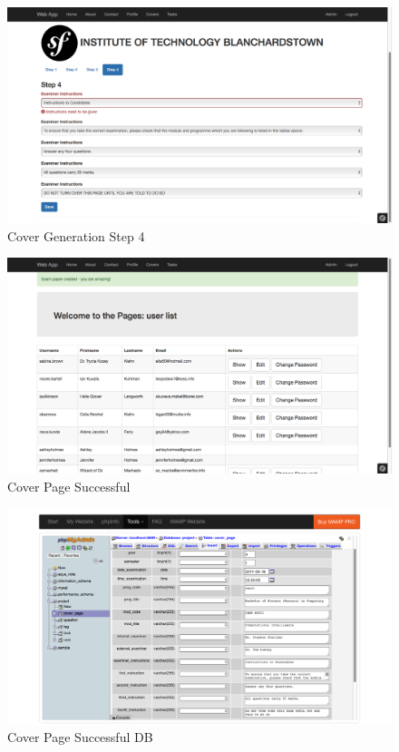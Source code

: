 \begin{figure}[htbp]
   \centering
   \includegraphics[width=400pt]{figures/step_4.png} %
   \caption{Cover Generation Step 4}
   \label{fig:Cover Generation Step 4}
\end{figure}

\begin{figure}[htbp]
   \centering
   \includegraphics[width=400pt]{figures/exam_success.png} %
   \caption{Cover Page Successful}
   \label{fig:Cover Page Successful}
\end{figure}

\begin{figure}[htbp]
   \centering
   \includegraphics[width=400pt]{figures/exam_success_db.png} %
   \caption{Cover Page Successful DB}
   \label{fig:Cover Page Successful DB}
\end{figure}

